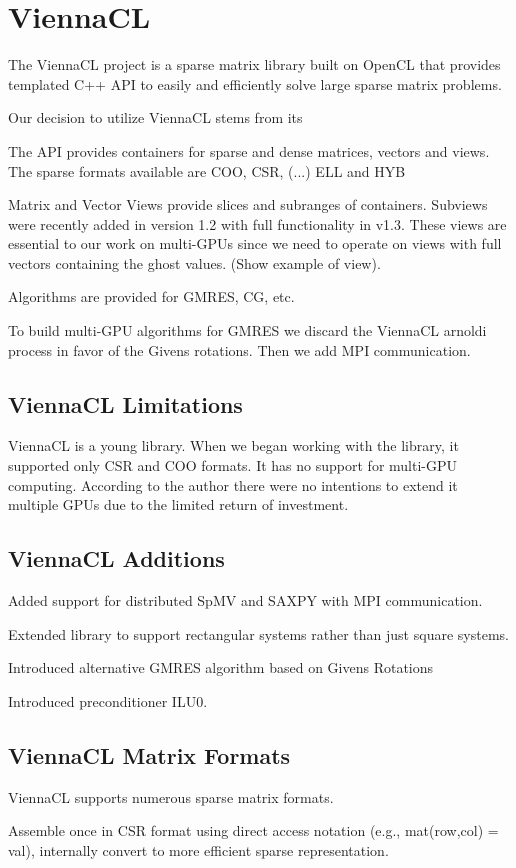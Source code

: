 \documentclass{report}
\begin{document}
\fi


\chapter{ViennaCL}


The ViennaCL project \cite{Rupp2010a, Rupp2010} is a sparse matrix library built on OpenCL that provides templated C++ API to easily and efficiently solve large sparse matrix problems. 

Our decision to utilize ViennaCL stems from its 

The API provides containers for sparse and dense matrices, vectors and views. The sparse formats available are COO, CSR, (...) ELL and HYB

Matrix and Vector Views provide slices and subranges of containers. Subviews were recently added in version 1.2 with full functionality in v1.3. These views are essential to our work on multi-GPUs since we need to operate on views with full vectors containing the ghost values. (Show example of view). 

Algorithms are provided for GMRES, CG, etc. 

To build multi-GPU algorithms for GMRES we discard the ViennaCL arnoldi process in favor of the Givens rotations. Then we add MPI communication. 



\section{ViennaCL Limitations}
ViennaCL is a young library. When we began working with the library, it supported only CSR and COO formats. It has no support for multi-GPU computing. According to the author there were no intentions to extend it multiple GPUs due to the limited return of investment. 

\section{ViennaCL Additions}
Added support for distributed SpMV and SAXPY with MPI communication. 

Extended library to support rectangular systems rather than just square systems. 

Introduced alternative GMRES algorithm based on Givens Rotations

Introduced preconditioner ILU0. 

\section{ViennaCL Matrix Formats}

ViennaCL supports numerous sparse matrix formats. 

Assemble once in CSR format using direct access notation (e.g., mat(row,col) = val), internally convert to more efficient sparse representation. 


\ifstandalone


\end{document}

